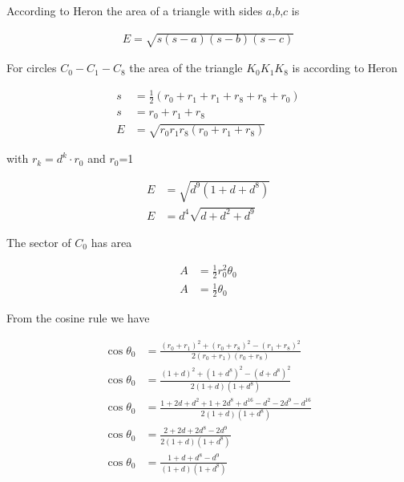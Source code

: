 \documentclass[12pt]{scrartcl}
\begin{document}
According to Heron the area of a triangle with sides $a$,$b$,$c$ is

\begin{align*}
    E=\sqrt{s(s-a)(s-b)(s-c)}
\end{align*}

For circles $C_0-C_1-C_8$ the area of the triangle $K_0K_1K_8$ is according to Heron

\begin{align*}
    s & =\frac{1}{2} \left( r_0+r_1+r_1+r_8+r_8+r_0 \right) \\
    s & =r_0+r_1+r_8                                        \\
    E & =\sqrt{r_0r_1r_8(r_0+r_1+r_8)}
\end{align*}

with $r_k=d^k\cdot r_0$ and $r_0$=1

\begin{align*}
    E & =\sqrt{d^9(1+d+d^8)} \\
    E & =d^4\sqrt{d+d^2+d^9}
\end{align*}

The sector of $C_0$ has area

\begin{align*}
    A & =\frac{1}{2}r_0^2\theta_0 \\
    A & =\frac{1}{2}\theta_0
\end{align*}

From the cosine rule we have

\begin{align*}
    \cos\theta_0 & =\frac{(r_0+r_1)^2+(r_0+r_8)^2-(r_1+r_8)^2}{2(r_0+r_1)(r_0+r_8)} \\
    \cos\theta_0 & =\frac{(1+d)^2+(1+d^8)^2-(d+d^8)^2}{2(1+d)(1+d^8)}               \\
    \cos\theta_0 & =\frac{1+2d+d^2+1+2d^8+d^{16}-d^2-2d^9-d^{16}}{2(1+d)(1+d^8)}    \\
    \cos\theta_0 & =\frac{2+2d+2d^8-2d^9}{2(1+d)(1+d^8)}                            \\
    \cos\theta_0 & =\frac{1+d+d^8-d^9}{(1+d)(1+d^8)}                                \\
\end{align*}


\end{document}
